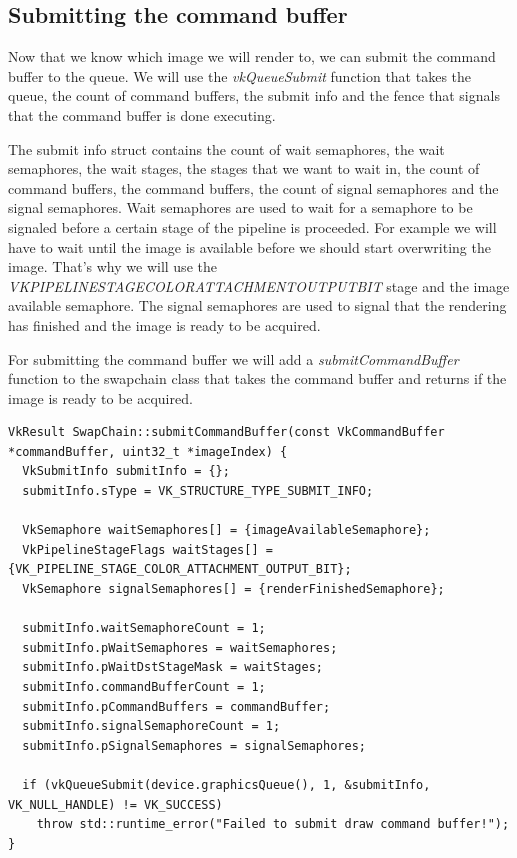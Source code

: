 \documentclass[12pt]{report} \usepackage{preamble}
\begin{document}
\subsection{Submitting the command buffer}

Now that we know which image we will render to, we can submit the command buffer to the queue. We will use the \textit{vkQueueSubmit}
function that takes the queue, the count of command buffers, the submit info and the fence that signals that the command buffer is done executing.

The submit info struct contains the count of wait semaphores, the wait semaphores, the wait stages, the stages that we want to wait in,
the count of command buffers, the command buffers, the count of signal semaphores and the signal semaphores. Wait semaphores are used to wait for
a semaphore to be signaled before a certain stage of the pipeline is proceeded. For example we will have to wait until the image is available
before we should start overwriting the image. That's why we will use the
\textit{VK\textunderscore PIPELINE\textunderscore STAGE\textunderscore COLOR\textunderscore ATTACHMENT\textunderscore OUTPUT\textunderscore BIT}
stage and the image available semaphore. The signal semaphores are used to signal that the rendering has finished and the image is ready to be
acquired.

For submitting the command buffer we will add a \textit{submitCommandBuffer} function to the swapchain class that takes the command buffer and returns
if the image is ready to be acquired.

\begin{lstlisting}[Language=C++]
VkResult SwapChain::submitCommandBuffer(const VkCommandBuffer *commandBuffer, uint32_t *imageIndex) {
  VkSubmitInfo submitInfo = {};
  submitInfo.sType = VK_STRUCTURE_TYPE_SUBMIT_INFO;

  VkSemaphore waitSemaphores[] = {imageAvailableSemaphore};
  VkPipelineStageFlags waitStages[] = {VK_PIPELINE_STAGE_COLOR_ATTACHMENT_OUTPUT_BIT};
  VkSemaphore signalSemaphores[] = {renderFinishedSemaphore};

  submitInfo.waitSemaphoreCount = 1;
  submitInfo.pWaitSemaphores = waitSemaphores;
  submitInfo.pWaitDstStageMask = waitStages;
  submitInfo.commandBufferCount = 1;
  submitInfo.pCommandBuffers = commandBuffer;
  submitInfo.signalSemaphoreCount = 1;
  submitInfo.pSignalSemaphores = signalSemaphores;

  if (vkQueueSubmit(device.graphicsQueue(), 1, &submitInfo, VK_NULL_HANDLE) != VK_SUCCESS)
    throw std::runtime_error("Failed to submit draw command buffer!");
}
\end{lstlisting}
\end{document}
